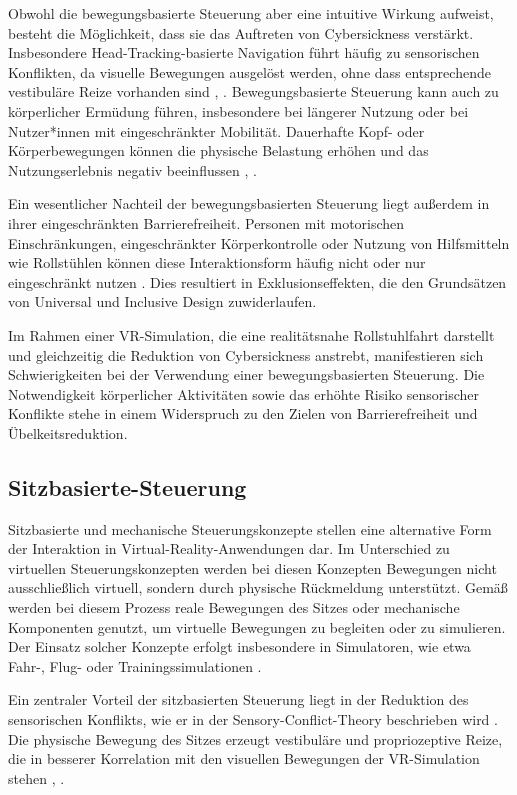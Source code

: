 Obwohl die bewegungsbasierte Steuerung aber eine intuitive Wirkung aufweist, besteht die Möglichkeit, dass sie das Auftreten von Cybersickness verstärkt. Insbesondere Head-Tracking-basierte Navigation führt häufig zu sensorischen Konflikten, da visuelle Bewegungen ausgelöst werden, ohne dass entsprechende vestibuläre Reize vorhanden sind \cite{Keshavarz2011}, \cite{LaViola2000}. Bewegungsbasierte Steuerung kann auch zu körperlicher Ermüdung führen, insbesondere bei längerer Nutzung oder bei Nutzer*innen mit eingeschränkter Mobilität. Dauerhafte Kopf- oder Körperbewegungen können die physische Belastung erhöhen und das Nutzungserlebnis negativ beeinflussen \cite{Jason2015}, \cite{Stanney2020}.

Ein wesentlicher Nachteil der bewegungsbasierten Steuerung liegt außerdem in ihrer eingeschränkten Barrierefreiheit. Personen mit motorischen Einschränkungen, eingeschränkter Körperkontrolle oder Nutzung von Hilfsmitteln wie Rollstühlen können diese Interaktionsform häufig nicht oder nur eingeschränkt nutzen \cite{Clarkson2003}. Dies resultiert in Exklusionseffekten, die den Grundsätzen von Universal und Inclusive Design zuwiderlaufen.

Im Rahmen einer VR-Simulation, die eine realitätsnahe Rollstuhlfahrt darstellt und gleichzeitig die Reduktion von Cybersickness anstrebt, manifestieren sich Schwierigkeiten bei der Verwendung einer bewegungsbasierten Steuerung. Die Notwendigkeit körperlicher Aktivitäten sowie das erhöhte Risiko sensorischer Konflikte stehe in einem Widerspruch zu den Zielen von Barrierefreiheit und Übelkeitsreduktion.

\subsection{Sitzbasierte-Steuerung}
Sitzbasierte und mechanische Steuerungskonzepte stellen eine alternative Form der Interaktion in Virtual-Reality-Anwendungen dar. Im Unterschied zu virtuellen Steuerungskonzepten werden bei diesen Konzepten Bewegungen nicht ausschließlich virtuell, sondern durch physische Rückmeldung unterstützt. Gemäß \cite{Jason2015} werden bei diesem Prozess reale Bewegungen des Sitzes oder mechanische Komponenten genutzt, um virtuelle Bewegungen zu begleiten oder zu simulieren. Der Einsatz solcher Konzepte erfolgt insbesondere in Simulatoren, wie etwa Fahr-, Flug- oder Trainingssimulationen \cite{Jason2015}.

Ein zentraler Vorteil der sitzbasierten Steuerung liegt in der Reduktion des sensorischen Konflikts, wie er in der Sensory-Conflict-Theory beschrieben wird \cite{Reason1975}. Die physische Bewegung des Sitzes erzeugt vestibuläre und propriozeptive Reize, die in besserer Korrelation mit den visuellen Bewegungen der VR-Simulation stehen \cite{LaViola2000}, \cite{Stanney2020}.


